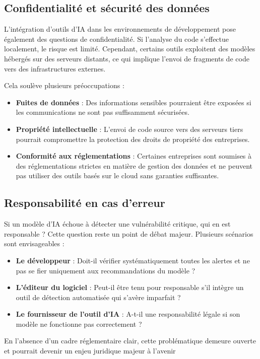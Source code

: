 \subsection{Confidentialité et sécurité des données}



L’intégration
d’outils d’IA dans les environnements de développement pose également des
questions de confidentialité. Si l’analyse du code s’effectue localement, le
risque est limité. Cependant, certains outils exploitent des modèles hébergés
sur des serveurs distants, ce qui implique l’envoi de fragments de code vers
des infrastructures externes.



Cela soulève
plusieurs préoccupations :



\begin{itemize}

 \item \textbf{Fuites
     de données} : Des informations sensibles pourraient être
     exposées si les communications ne sont pas suffisamment sécurisées.

 \item \textbf{Propriété
     intellectuelle} : L'envoi de code source vers des serveurs tiers
     pourrait compromettre la protection des droits de propriété des
     entreprises.

 \item \textbf{Conformité
     aux réglementations} : Certaines entreprises sont soumises à des
     réglementations strictes en matière de gestion des données et ne peuvent
     pas utiliser des outils basés sur le cloud sans garanties suffisantes.

\end{itemize}


\subsection{Responsabilité en cas d’erreur}



Si un modèle
d’IA échoue à détecter une vulnérabilité critique, qui en est responsable ?
Cette question reste un point de débat majeur. Plusieurs scénarios sont
envisageables :



\begin{itemize}

 \item \textbf{Le
     développeur} : Doit-il vérifier systématiquement toutes les
     alertes et ne pas se fier uniquement aux recommandations du modèle ?

 \item \textbf{L’éditeur
     du logiciel} : Peut-il être tenu pour responsable s’il
     intègre un outil de détection automatisée qui s’avère imparfait ?

 \item \textbf{Le
     fournisseur de l’outil d’IA} : A-t-il une responsabilité légale si son modèle
     ne fonctionne pas correctement ?

\end{itemize}


En l’absence d’un cadre réglementaire clair, cette problématique demeure ouverte et pourrait
devenir un enjeu juridique majeur à l’avenir




